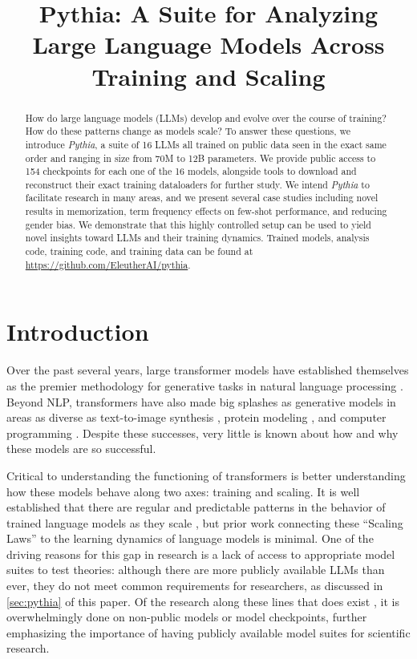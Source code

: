 \title{Pythia: A Suite for Analyzing Large Language Models Across Training and Scaling}

\begin{abstract}
How do large language models (LLMs) develop and evolve over the course of training? How do these patterns change as models scale? To answer these questions, we introduce \textit{Pythia}, a suite of 16 LLMs all trained on public data seen in the exact same order and ranging in size from 70M to 12B parameters. We provide public access to 154 checkpoints for each one of the 16 models, alongside tools to download and reconstruct their exact training dataloaders for further study. We intend \textit{Pythia} to facilitate research in many areas, and we present several case studies including novel results in memorization, term frequency effects on few-shot performance, and reducing gender bias. We demonstrate that this highly controlled setup can be used to yield novel insights toward LLMs and their training dynamics. Trained models, analysis code, training code, and training data can be found at \url{https://github.com/EleutherAI/pythia}.
\end{abstract}

\section{Introduction}\label{sec:introduction}
Over the past several years, large transformer models have established themselves as the premier methodology for generative tasks in natural language processing \citep{brown2020language,sanh2021multitask,chowdhery2022palm}. Beyond NLP, transformers have also made big splashes as generative models in areas as diverse as text-to-image synthesis \citep{ramesh2022hierarchical,crowson2022vqgan,rombach2022high}, protein modeling \citep{jumper2021highly,ahdritz2022openfold}, and computer programming \citep{chen2021evaluating,xu2022systematic,fried2022incoder}. Despite these successes, very little is known about how and why these models are so successful.

Critical to understanding the functioning of transformers is better understanding how these models behave along two axes: training and scaling. It is well established that there are regular and predictable patterns in the behavior of trained language models as they scale \citep{kaplan2020scaling,henighan2020scaling,hernandez2021scaling,mikami2021scaling,pu2021scaling,sharma2020neural,ghorbani2021scaling}, but prior work connecting these ``Scaling Laws'' to the learning dynamics of language models is minimal. One of the driving reasons for this gap in research is a lack of access to appropriate model suites to test theories: although there are more publicly available LLMs than ever, they do not meet common requirements for researchers, as discussed in \ref{sec:pythia} of this paper.  Of the research along these lines that does exist \citep{mcgrath2021acquisition,tirumala2022memorization,xia2022training},  it is overwhelmingly done on non-public models or model checkpoints, further emphasizing the importance of having publicly available model suites for scientific research.

